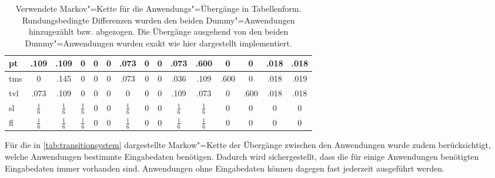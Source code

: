 \begin{table}
{\begin{tabular}{|l|c|c|c|c|c|c|c|c|c|c|c|c|c|c|}
    	\acs{pt}  &     .109      &     .109      &       0       &     0     &    0     &     .073      &    0     &     0     &     .073      &     .600      &     0     &     0     &   .018   &   .018   \\ \hline
    	\acs{tms} &       0       &     .145      &       0       &     0     &    0     &     .073      &    0     &     0     &     .036      &     .109      &   .600    &     0     &   .018   &   .019   \\ \hline
    	\acs{tvl} &     .073      &     .109      &       0       &     0     &    0     &       0       &    0     &     0     &     .109      &     .073      &     0     &   .600    &   .018   &   .018   \\ \hline
    	\acs{sl}  & $\frac{1}{6}$ & $\frac{1}{6}$ & $\frac{1}{6}$ &     0     &    0     & $\frac{1}{6}$ &    0     &     0     & $\frac{1}{6}$ & $\frac{1}{6}$ &     0     &     0     &    0     &    0     \\ \hline
    	\acs{fl}  & $\frac{1}{6}$ & $\frac{1}{6}$ & $\frac{1}{6}$ &     0     &    0     & $\frac{1}{6}$ &    0     &     0     & $\frac{1}{6}$ & $\frac{1}{6}$ &     0     &     0     &    0     &    0     \\ \hline
    \end{tabular}}
    \caption[Verwendete Markov"=Kette für die Anwendungs"=Übergänge in Tabellenform]
    {Verwendete Markov"=Kette für die Anwendungs"=Übergänge in Tabellenform.
        Rundungsbedingte Differenzen wurden den beiden Dummy"=Anwendungen hinzugezählt bzw. abgezogen.
        Die Übergänge ausgehend von den beiden Dummy"=Anwendungen wurden exakt wie hier dargestellt implementiert.}
    \label{tab:transitionsystem}
\end{table}

Für die in \autoref{tab:transitionsystem} dargestellte Markow"=Kette der Übergänge zwischen den Anwendungen wurde zudem berücksichtigt, welche Anwendungen bestimmte Eingabedaten benötigen.
Dadurch wird sichergestellt, dass die für einige Anwendungen benötigten Eingabedaten immer vorhanden sind.
Anwendungen ohne Eingabedaten können dagegen fast jederzeit ausgeführt werden.
